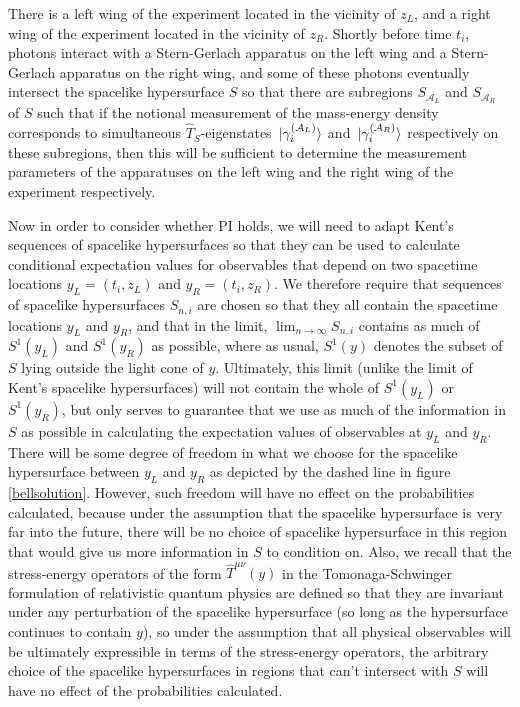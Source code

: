 There is a left wing of the experiment located in the vicinity of $z_L$, and a right wing of the experiment located in the vicinity of $z_R$. Shortly before time $t_i$, photons interact with a Stern-Gerlach apparatus on the left wing and a Stern-Gerlach apparatus on the right wing, and some of these photons eventually intersect the spacelike hypersurface $S$ so that there are subregions $S_{\mathcal{A}_L}$ and $S_{\mathcal{A}_R}$ of $S$ such that if the notional measurement of the mass-energy density corresponds to simultaneous $\hat{T}_S$-eigenstates $\ket*{\gamma_i^{(\mathcal{A}_L)}}$ and $\ket*{\gamma_i^{(\mathcal{A}_R)}}$ respectively on these subregions, then this will be sufficient to determine the measurement parameters of the apparatuses on the left wing and the right wing of the experiment respectively. 

Now in order to consider whether PI holds, we will need to adapt Kent's sequences of spacelike hypersurfaces so that they can be used to calculate conditional expectation values for observables that depend on two spacetime locations $y_L=(t_i, z_L)$ and $y_R=(t_i,z_R)$.  We therefore require that sequences of spacelike hypersurfaces $S_{n,i}$ are chosen so that they all contain the spacetime locations $y_L$ and $y_R$, and that in the limit, $\lim_{n\rightarrow\infty}S_{n,i}$ contains as much of $S^1(y_L)$ and $S^1(y_R)$ as possible, where as usual, $S^1(y)$ denotes the subset of $S$ lying outside the light cone of $y$. Ultimately, this limit (unlike the limit of Kent's spacelike hypersurfaces) will not contain the whole of $S^1(y_L)$ or $S^1(y_R)$, but only serves to guarantee that we use as much of the information in $S$ as possible in calculating the expectation values of observables at $y_L$ and $y_R$. There will be some degree of freedom in what we choose for the spacelike hypersurface between $y_L$ and $y_R$ as depicted by the dashed line in figure \ref{bellsolution}. However, such freedom will have no effect on the probabilities calculated, because under the assumption that the spacelike hypersurface is very far into the future, there will be no choice of spacelike hypersurface in this region that would give us more information in $S$ to condition on. Also, we recall that the stress-energy operators of the form $\hat{T}^{\mu\nu}(y)$ in the Tomonaga-Schwinger formulation of relativistic quantum physics are defined so that they are invariant under any perturbation of the spacelike hypersurface (so long as the hypersurface continues to contain $y$), so under the assumption that all physical observables will be ultimately expressible in terms of the stress-energy operators, the arbitrary choice of the spacelike hypersurfaces in regions that can't intersect with $S$ will have no effect of the probabilities calculated. 

